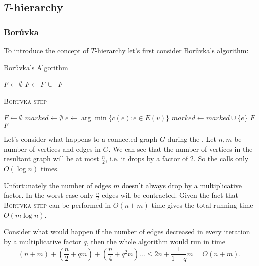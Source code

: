\subsection{$T$-hierarchy}
\subsubsection{Borůvka}
To introduce the concept of $T$-hierarchy let's first consider Borůvka's algorithm:

\begin{algorithm}[H]
\caption{Borůvka’s Algorithm}
\label{bor}
\begin{algorithmic}[1]
    \State $F \gets \emptyset$ 
        \State $F \gets F\ \cup\ $ 
    \EndWhile
    \State \Return $F$
\EndFunction
\end{algorithmic}
\end{algorithm}

\begin{algorithm}[H]
\caption{\textsc{Boruvka-step}}
\label{bor-step}
\begin{algorithmic}[1]
    \State $F \gets \emptyset$
    \State $marked \gets \emptyset$
        \State $e \gets \arg\min{\{c(e)\colon e \in E(v)\}}$
        \State $marked \gets marked \cup \{e\}$
    \EndFor
        \State {}
        \State $F$
    \EndFor
    \State \Return $F$
\EndFunction
\end{algorithmic}
\end{algorithm}
\FloatBarrier
Let's consider what happens to a connected graph $G$ during the . Let $n, m$ be number of vertices and edges in $G$. We can see that the number of vertices in the resultant graph will be at most $\frac{n}{2}$, i.e. it drops by a factor of $2$. So the  calls  only $O(\log{n})$ times. 

 Unfortunately the number of edges $m$ doesn't always drop by a multiplicative factor. In the worst case only $\frac{n}{2}$ edges will be contracted. Given the fact that \textsc{Boruvka-step} can be performed in $O(n + m)$ time gives the total running time $O(m\log{n})$. 
 
 Consider what would happen if the number of edges decreased in every iteration by a multiplicative factor $q$, then the whole algorithm would run in time \begin{equation*}
     \left(n + m\right) + \left(\frac{n}{2} + qm\right) + \left(\frac{n}{4} + q^2m\right) ... \leq 2n + \frac{1}{1-q} m = O(n + m).
 \end{equation*}

